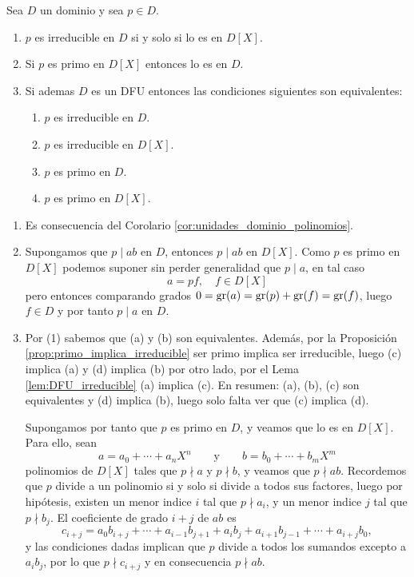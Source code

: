 \begin{lemma}{}{}
Sea $D$ un dominio y sea $p\in D$.

\begin{enumerate}
    \item $p$ es irreducible en $D$ si y solo si lo es en $D[X]$.
    \item Si $p$ es primo en $D[X]$ entonces lo es en $D$.
    \item Si ademas $D$ es un DFU entonces las condiciones siguientes son equivalentes:
    \begin{enumerate}
        \item $p$ es irreducible en $D$.
        \item $p$ es irreducible en $D[X]$.
        \item $p$ es primo en $D$.
        \item $p$ es primo en $D[X]$.
    \end{enumerate}
\end{enumerate}

\end{lemma}

\begin{proofbox}
\begin{enumerate}
    \item Es consecuencia del Corolario \ref{cor:unidades_dominio_polinomios}.
    \item Supongamos que $p \mid ab$ en $D$, entonces $p \mid ab$ en $D[X]$. Como $p$ es primo en $D[X]$ podemos suponer sin perder generalidad que $p \mid a$, en tal caso
    \[
    a = pf,\quad f \in D[X]
    \] 
    pero entonces comparando grados $0 = \operatorname{gr}(a) = \operatorname{gr}(p) + \operatorname{gr}(f) = \operatorname{gr}(f)$, luego $f \in D$ y por tanto $p \mid a$ en $D$.
    \item Por (1) sabemos que (a) y (b) son equivalentes. Además, por la Proposición \ref{prop:primo_implica_irreducible} ser primo implica ser irreducible, luego (c) implica (a) y (d) implica (b) por otro lado, por el Lema \ref{lem:DFU_irreducible} (a) implica (c). En resumen: (a), (b), (c) son equivalentes y (d) implica (b), luego solo falta ver que (c) implica (d).

    Supongamos por tanto que $p$ es primo en $D$, y veamos que lo es en $D[X]$. Para ello, sean
    \[
    a=a_{0}+\cdots+a_{n}X^{n}\qquad\text{y}\qquad b=b_{0}+\cdots+b_{m}X^{m}
    \]
    polinomios de $D[X]$ tales que $p\nmid a$ y $p\nmid b$, y veamos que $p\nmid ab$. Recordemos que $p$ divide a un polinomio si y solo si divide a todos sus factores, luego por hipótesis, existen un menor indice $i$ tal que $p\nmid a_{i}$, y un menor indice $j$ tal que $p\nmid b_{j}$. El coeficiente de grado $i+j$ de $ab$ es
    \[
    c_{i+j}=a_{0}b_{i+j}+\cdots+a_{i-1}b_{j+1}+a_{i}b_{j}+a_{i+1}b_{j-1}+\cdots+a_{i +j}b_{0},
    \]
    y las condiciones dadas implican que $p$ divide a todos los sumandos excepto a $a_{i}b_{j}$, por lo que $p\nmid c_{i+j}$ y en consecuencia $p\nmid ab$.
\end{enumerate}

\end{proofbox}


